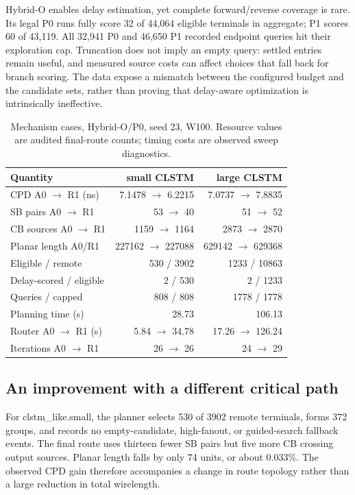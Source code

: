 \documentclass[conference,10pt]{IEEEtran}
\begin{document}
Hybrid-O enables delay estimation, yet complete forward/reverse coverage is rare. Its legal P0 runs fully score 32 of 44,064 eligible terminals in aggregate; P1 scores 60 of 43,119. All 32,941 P0 and 46,650 P1 recorded endpoint queries hit their exploration cap. Truncation does not imply an empty query: settled entries remain useful, and measured source costs can affect choices that fall back for branch scoring. The data expose a mismatch between the configured budget and the candidate sets, rather than proving that delay-aware optimization is intrinsically ineffective.

\begin{table}[h]
\centering\caption{Mechanism cases, Hybrid-O/P0, seed 23, W100. Resource values are audited final-route counts; timing costs are observed sweep diagnostics.}
\label{tab:mechanism}
\small\setlength{\tabcolsep}{3pt}
\begin{tabular}{lrr}\hline
Quantity&small CLSTM&large CLSTM\\\hline
CPD A0 $\rightarrow$ R1 (ns)&7.1478 $\to$ 6.2215&7.0737 $\to$ 7.8835\\
SB pairs A0 $\rightarrow$ R1&53 $\rightarrow$ 40&51 $\rightarrow$ 52\\
CB sources A0 $\rightarrow$ R1&1159 $\rightarrow$ 1164&2873 $\rightarrow$ 2870\\
Planar length A0/R1&227162 $\rightarrow$ 227088&629142 $\rightarrow$ 629368\\
Eligible / remote&530 / 3902&1233 / 10863\\
Delay-scored / eligible&2 / 530&2 / 1233\\
Queries / capped&808 / 808&1778 / 1778\\
Planning time (s)&28.73&106.13\\
Router A0 $\rightarrow$ R1 (s)&5.84 $\rightarrow$ 34.78&17.26 $\rightarrow$ 126.24\\
Iterations A0 $\rightarrow$ R1&26 $\rightarrow$ 26&24 $\rightarrow$ 29\\\hline
\end{tabular}
\end{table}

\subsection{An improvement with a different critical path}
For clstm\_like.small, the planner selects 530 of 3902 remote terminals, forms 372 groups, and records no empty-candidate, high-fanout, or guided-search fallback events. The final route uses thirteen fewer SB pairs but five more CB crossing output sources. Planar length falls by only 74 units, or about 0.033\%. The observed CPD gain therefore accompanies a change in route topology rather than a large reduction in total wirelength.
\end{document}
